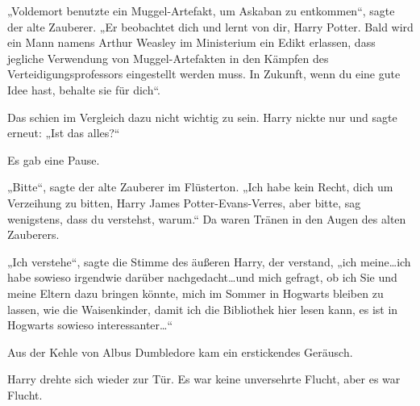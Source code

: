 „Voldemort benutzte ein Muggel-Artefakt, um Askaban zu entkommen“, sagte der alte Zauberer. „Er beobachtet dich und lernt von dir, Harry Potter. Bald wird ein Mann namens Arthur Weasley im Ministerium ein Edikt erlassen, dass jegliche Verwendung von Muggel-Artefakten in den Kämpfen des Verteidigungsprofessors eingestellt werden muss. In Zukunft, wenn du eine gute Idee hast, behalte sie für dich“.

Das schien im Vergleich dazu nicht wichtig zu sein. Harry nickte nur und sagte erneut: „Ist das alles?“

Es gab eine Pause.

„Bitte“, sagte der alte Zauberer im Flüsterton. „Ich habe kein Recht, dich um Verzeihung zu bitten, Harry James Potter-Evans-Verres, aber bitte, sag wenigstens, dass du verstehst, warum.“ Da waren Tränen in den Augen des alten Zauberers.

„Ich verstehe“, sagte die Stimme des äußeren Harry, der verstand, „ich meine…ich habe sowieso irgendwie darüber nachgedacht…und mich gefragt, ob ich Sie und meine Eltern dazu bringen könnte, mich im Sommer in Hogwarts bleiben zu lassen, wie die Waisenkinder, damit ich die Bibliothek hier lesen kann, es ist in Hogwarts sowieso interessanter…“

Aus der Kehle von Albus Dumbledore kam ein erstickendes Geräusch.

Harry drehte sich wieder zur Tür. Es war keine unversehrte Flucht, aber es war Flucht.

